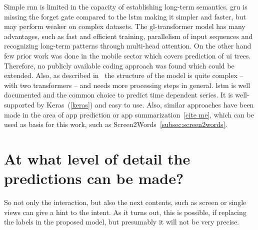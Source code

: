 Simple \gls{rnn} is limited in the capacity of establishing long-term semantics.
\gls{gru} is missing the forget gate compared to the \gls{lstm} making it simpler and faster, but may perform weaker on complex datasets.
The \gls{gl-transformer} model has many advantages, such as fast and efficient training, parallelism of input sequences and recognizing long-term patterns through multi-head attention.
On the other hand few prior work was done in the mobile sector which covers prediction of \gls{ui} trees.
Therefore, no publicly available coding approach was found which could be extended.
Also, as described in~\cite{zhou2021large} the structure of the model is quite complex -- with two transformers -- and needs more processing steps in general.
\gls{lstm} is well documented and the common choice to predict time dependent series.
It is well-supported by Keras~(\ref{keras}) and easy to use.
Also, similar approaches have been made in the area of app prediction or app summarization~\ref{cite me}, which can be used as basis for this work, such as Screen2Words~\ref{subsec:screen2words}.


\section{At what level of detail the predictions can be made?}

%
So not only the interaction, but also the next contents, such as screen or single views can give a hint to the intent.
As it turns out, this is possible, if replacing the labels in the proposed model, but presumably it will not be very precise.

